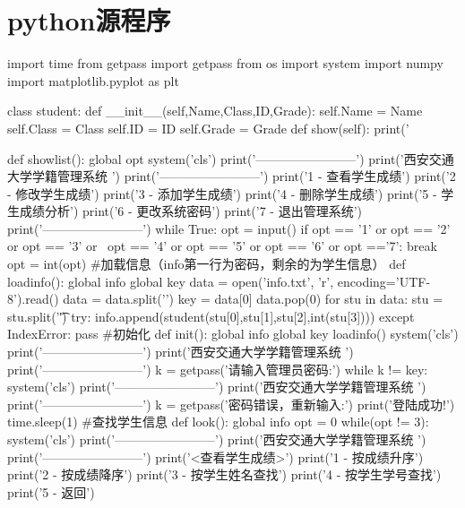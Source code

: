 \documentclass{article}
\begin{document}
\section{python源程序}
\begin{python}
import time
from getpass import getpass
from os import system
import numpy
import matplotlib.pyplot as plt

class student:
    def __init__(self,Name,Class,ID,Grade):
        self.Name = Name
        self.Class = Class
        self.ID = ID
        self.Grade = Grade
    def show(self):
        print('%

def showlist():
    global opt
    system('cls')
    print('------------------------')
    print('西安交通大学学籍管理系统     ')
    print('------------------------')
    print('1 - 查看学生成绩')
    print('2 - 修改学生成绩')
    print('3 - 添加学生成绩')
    print('4 - 删除学生成绩')
    print('5 - 学生成绩分析')
    print('6 - 更改系统密码')
    print('7 - 退出管理系统')
    print('------------------------')
    while True:
        opt = input()
        if opt == '1' or opt == '2' or opt == '3' or \
        opt == '4' or opt == '5' or opt == '6' or opt =='7':
            break
    opt = int(opt)
#加载信息（info第一行为密码，剩余的为学生信息）
def loadinfo():
    global info
    global key
    data = open('info.txt', 'r', encoding='UTF-8').read()
    data = data.split('\n')
    key = data[0]
    data.pop(0)
    for stu in data:
        stu = stu.split('\t')
        try:
            info.append(student(stu[0],stu[1],stu[2],int(stu[3])))
        except IndexError:
            pass
#初始化
def init():
    global info
    global key
    loadinfo()
    system('cls')
    print('------------------------')
    print('西安交通大学学籍管理系统     ')
    print('------------------------')
    k = getpass('请输入管理员密码:')
    while k != key:
        system('cls')
        print('------------------------')
        print('西安交通大学学籍管理系统     ')
        print('------------------------')
        k = getpass('密码错误，重新输入:')
    print('登陆成功!')
    time.sleep(1)
#查找学生信息
def look():
    global info
    opt = 0
    while(opt != 3):
        system('cls')
        print('------------------------')
        print('西安交通大学学籍管理系统     ')
        print('------------------------')
        print('<查看学生成绩>')
        print('1 - 按成绩升序')
        print('2 - 按成绩降序')
        print('3 - 按学生姓名查找')
        print('4 - 按学生学号查找')
        print('5 - 返回')

\end{python}
\end{document}
